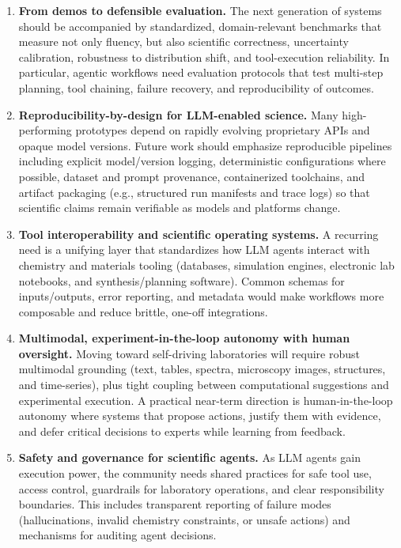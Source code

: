 \documentclass{article}
\begin{document}
\begin{enumerate}
    \item \textbf{From demos to defensible evaluation.}
    The next generation of systems should be accompanied by standardized, domain-relevant benchmarks that
    measure not only fluency, but also scientific correctness, uncertainty calibration, robustness to distribution
    shift, and tool-execution reliability. In particular, agentic workflows need evaluation protocols that test
    multi-step planning, tool chaining, failure recovery, and reproducibility of outcomes.

    \item \textbf{Reproducibility-by-design for LLM-enabled science.}
    Many high-performing prototypes depend on rapidly evolving proprietary APIs and opaque model versions.
    Future work should emphasize reproducible pipelines including explicit model/version logging, deterministic
    configurations where possible, dataset and prompt provenance, containerized toolchains, and artifact
    packaging (e.g., structured run manifests and trace logs) so that scientific claims remain verifiable as
    models and platforms change.

    \item \textbf{Tool interoperability and scientific operating systems.}
    A recurring need is a unifying layer that standardizes how LLM agents interact with chemistry and
    materials tooling (databases, simulation engines, electronic lab notebooks, and synthesis/planning
    software). Common schemas for inputs/outputs, error reporting, and metadata would make workflows more
    composable and reduce brittle, one-off integrations.

    \item \textbf{Multimodal, experiment-in-the-loop autonomy with human oversight.}
    Moving toward self-driving laboratories will require robust multimodal grounding (text, tables, spectra,
    microscopy images, structures, and time-series), plus tight coupling between computational suggestions
    and experimental execution. A practical near-term direction is human-in-the-loop autonomy where systems
    that propose actions, justify them with evidence, and defer critical decisions to experts while learning from feedback.

    \item \textbf{Safety and governance for scientific agents.}
    As LLM agents gain execution power, the community needs shared practices for safe tool use, access
    control, guardrails for laboratory operations, and clear responsibility boundaries. This includes
    transparent reporting of failure modes (hallucinations, invalid chemistry constraints, or unsafe actions)
    and mechanisms for auditing agent decisions.
\end{enumerate}
\end{document}

